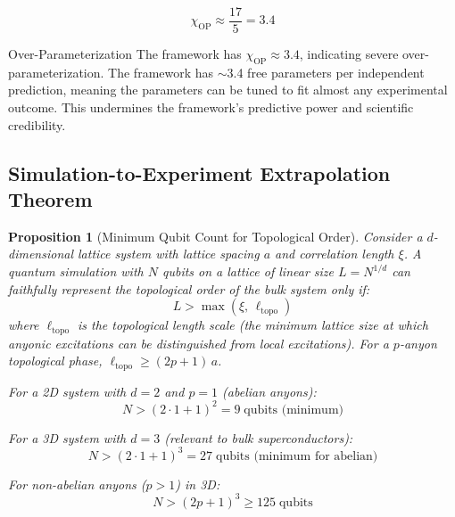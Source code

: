 \documentclass[11pt,a4paper]{article}
\newtheorem{proposition}{Proposition}
\begin{document}
\begin{equation}
  \chi_{\text{OP}} \approx \frac{17}{5} = 3.4
\end{equation}

\begin{critbox}{Over-Parameterization}
The framework has $\chi_{\text{OP}} \approx 3.4$, indicating severe over-parameterization. The framework has $\sim$3.4 free parameters per independent prediction, meaning the parameters can be tuned to fit almost any experimental outcome. This undermines the framework's predictive power and scientific credibility.
\end{critbox}

\subsection{Simulation-to-Experiment Extrapolation Theorem}
\label{sec:extrapolation}

\begin{proposition}[Minimum Qubit Count for Topological Order]
Consider a $d$-dimensional lattice system with lattice spacing $a$ and correlation length $\xi$. A quantum simulation with $N$ qubits on a lattice of linear size $L = N^{1/d}$ can faithfully represent the topological order of the bulk system only if:
\begin{equation}
  L > \max(\xi, \, \ell_{\text{topo}})
  \label{eq:min_qubit}
\end{equation}
where $\ell_{\text{topo}}$ is the topological length scale (the minimum lattice size at which anyonic excitations can be distinguished from local excitations). For a $p$-anyon topological phase, $\ell_{\text{topo}} \geq (2p+1)\,a$.

For a 2D system with $d=2$ and $p=1$ (abelian anyons):
\begin{equation}
  N > (2 \cdot 1 + 1)^2 = 9 \;\text{qubits (minimum)}
\end{equation}

For a 3D system with $d=3$ (relevant to bulk superconductors):
\begin{equation}
  N > (2 \cdot 1 + 1)^3 = 27 \;\text{qubits (minimum for abelian)}
\end{equation}

For non-abelian anyons ($p > 1$) in 3D:
\begin{equation}
  N > (2p+1)^3 \geq 125 \;\text{qubits}
\end{equation}
\end{proposition}
\end{document}
